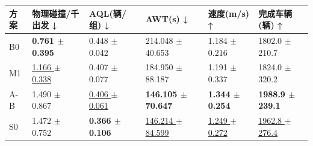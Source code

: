 \begin{tabular}{llllll}
\toprule
方案 & 物理碰撞/千出发 ↓ & AQL(辆/组) ↓ & AWT(s) ↓ & 速度(m/s) ↑ & 完成车辆(辆) ↑ \\
\midrule
B0 & \textbf{0.761 $\pm$ 0.395} & 0.448 $\pm$ 0.042 & 214.048 $\pm$ 40.653 & 1.184 $\pm$ 0.216 & 1802.0 $\pm$ 210.7 \\
M1 & \underline{1.166 $\pm$ 0.338} & 0.407 $\pm$ 0.077 & 184.950 $\pm$ 88.187 & 1.191 $\pm$ 0.337 & 1824.0 $\pm$ 320.2 \\
A-B & 1.490 $\pm$ 0.867 & \underline{0.406 $\pm$ 0.061} & \textbf{146.105 $\pm$ 70.647} & \textbf{1.344 $\pm$ 0.254} & \textbf{1988.9 $\pm$ 239.1} \\
S0 & 1.472 $\pm$ 0.752 & \textbf{0.366 $\pm$ 0.106} & \underline{146.214 $\pm$ 84.599} & \underline{1.249 $\pm$ 0.272} & \underline{1962.8 $\pm$ 276.4} \\
\bottomrule
\end{tabular}